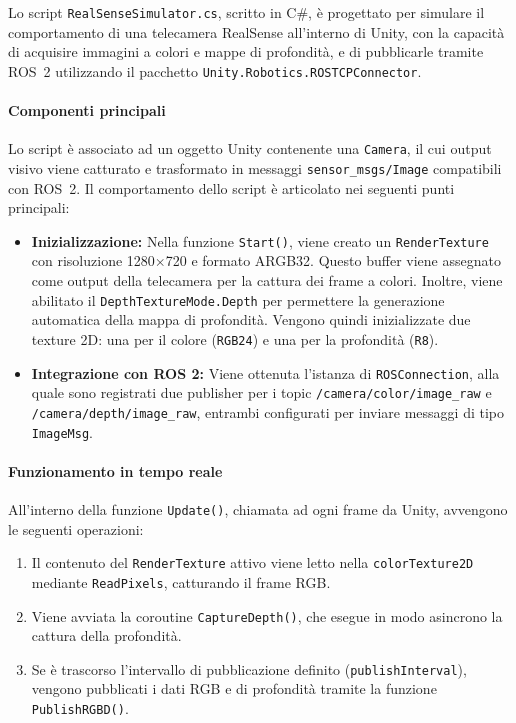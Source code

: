 \documentclass[11pt]{report}
\begin{document}
Lo script \texttt{RealSenseSimulator.cs}, scritto in C\#, è progettato per simulare il comportamento di una telecamera RealSense all'interno di Unity, con la capacità di acquisire immagini a colori e mappe di profondità, e di pubblicarle tramite ROS~2 utilizzando il pacchetto \texttt{Unity.Robotics.ROSTCPConnector}.

\paragraph{Componenti principali}
Lo script è associato ad un oggetto Unity contenente una \texttt{Camera}, il cui output visivo viene catturato e trasformato in messaggi \texttt{sensor\_msgs/Image} compatibili con ROS~2. Il comportamento dello script è articolato nei seguenti punti principali:

\begin{itemize}
  \item \textbf{Inizializzazione:} Nella funzione \texttt{Start()}, viene creato un \texttt{RenderTexture} con risoluzione 1280$\times$720 e formato ARGB32. Questo buffer viene assegnato come output della telecamera per la cattura dei frame a colori. Inoltre, viene abilitato il \texttt{DepthTextureMode.Depth} per permettere la generazione automatica della mappa di profondità. Vengono quindi inizializzate due texture 2D: una per il colore (\texttt{RGB24}) e una per la profondità (\texttt{R8}).
  
  \item \textbf{Integrazione con ROS 2:} Viene ottenuta l’istanza di \texttt{ROSConnection}, alla quale sono registrati due publisher per i topic \texttt{/camera/color/image\_raw} e \texttt{/camera/depth/image\_raw}, entrambi configurati per inviare messaggi di tipo \texttt{ImageMsg}.
\end{itemize}

\paragraph{Funzionamento in tempo reale}
All'interno della funzione \texttt{Update()}, chiamata ad ogni frame da Unity, avvengono le seguenti operazioni:
\begin{enumerate}
  \item Il contenuto del \texttt{RenderTexture} attivo viene letto nella \texttt{colorTexture2D} mediante \texttt{ReadPixels}, catturando il frame RGB.
  \item Viene avviata la coroutine \texttt{CaptureDepth()}, che esegue in modo asincrono la cattura della profondità.
  \item Se è trascorso l'intervallo di pubblicazione definito (\texttt{publishInterval}), vengono pubblicati i dati RGB e di profondità tramite la funzione \texttt{PublishRGBD()}.
\end{enumerate}
\end{document}
